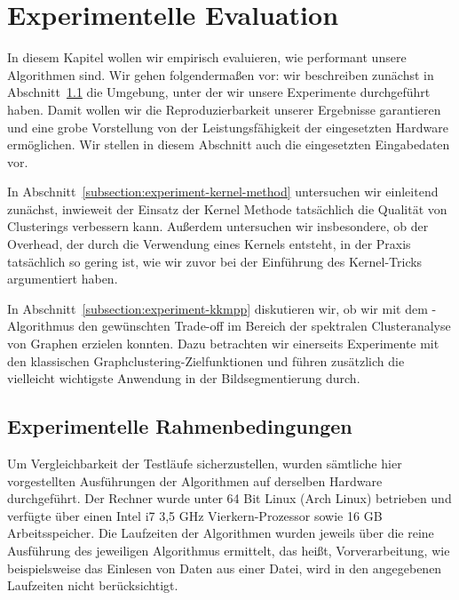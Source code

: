 \section{Experimentelle Evaluation}
\label{section:experiments}

In diesem Kapitel wollen wir empirisch evaluieren, wie performant unsere Algorithmen sind.
\absatz
Wir gehen folgendermaßen vor: wir beschreiben zunächst in Abschnitt~\ref{subsection:experiment-environment} die Umgebung, unter
der wir unsere Experimente durchgeführt haben. Damit wollen wir die Reproduzierbarkeit unserer Ergebnisse garantieren und eine
grobe Vorstellung von der Leistungsfähigkeit der eingesetzten Hardware ermöglichen. Wir stellen in diesem Abschnitt auch 
die eingesetzten Eingabedaten vor.

In Abschnitt~\ref{subsection:experiment-kernel-method} untersuchen wir einleitend zunächst, inwieweit der Einsatz der Kernel
Methode tatsächlich die Qualität von Clusterings verbessern kann. Außerdem untersuchen wir insbesondere, ob der Overhead,
der durch die Verwendung eines Kernels entsteht, in der Praxis tatsächlich so gering ist, wie wir zuvor bei der Einführung des
Kernel-Tricks argumentiert haben.

In Abschnitt~\ref{subsection:experiment-kkmpp} diskutieren wir, ob wir mit dem \kkmpp-Algorithmus den gewünschten Trade-off im
Bereich der spektralen Clusteranalyse von Graphen erzielen konnten. Dazu betrachten wir einerseits Experimente mit den klassischen
Graphclustering-Zielfunktionen und führen zusätzlich die vielleicht wichtigste Anwendung in der Bildsegmentierung durch.

\subsection{Experimentelle Rahmenbedingungen}
\label{subsection:experiment-environment}

Um Vergleichbarkeit der Testläufe sicherzustellen, wurden sämtliche hier vorgestellten Ausführungen der Algorithmen auf derselben
Hardware durchgeführt. Der Rechner wurde unter 64 Bit Linux (Arch Linux) betrieben und verfügte über einen
Intel i7 3,5 GHz Vierkern-Prozessor sowie 16 GB Arbeitsspeicher. Die Laufzeiten der Algorithmen wurden jeweils über die reine
Ausführung des jeweiligen Algorithmus ermittelt, das heißt, Vorverarbeitung, wie beispielsweise das Einlesen von Daten aus einer
Datei, wird in den angegebenen Laufzeiten nicht berücksichtigt.

